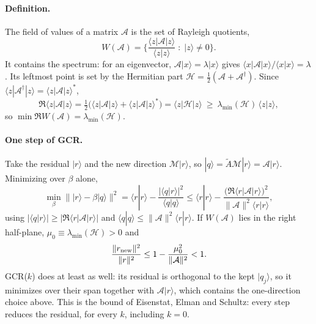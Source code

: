 \documentclass[11pt,a4paper]{article}
\numberwithin{equation}{section}
\newcommand{\dg}{^{\dagger}}
\begin{document}
\paragraph{Definition.} The field of values of a matrix $\mathcal A$ is the set of Rayleigh
quotients,
\begin{equation}
W(\mathcal A)=\Big\{\frac{\langle z|\mathcal A|z\rangle}{\langle z|z\rangle}\;:\;|z\rangle\neq0\Big\}.
\end{equation}
It contains the spectrum: for an eigenvector, $\mathcal A|x\rangle=\lambda|x\rangle$ gives
$\langle x|\mathcal A|x\rangle/\langle x|x\rangle=\lambda$. Its leftmost point is set by the Hermitian
part $\mathcal H=\frac12(\mathcal A+\mathcal A\dg)$. Since
$\langle z|\mathcal A\dg|z\rangle=\langle z|\mathcal A|z\rangle^*$,
\begin{equation}
\Re\langle z|\mathcal A|z\rangle=\tfrac12\big(\langle z|\mathcal A|z\rangle+\langle z|\mathcal A|z\rangle^*\big)
=\langle z|\mathcal H|z\rangle\ \ge\ \lambda_{\min}(\mathcal H)\,\langle z|z\rangle ,
\end{equation}
so $\min\Re W(\mathcal A)=\lambda_{\min}(\mathcal H)$.

\paragraph{One step of GCR.} Take the residual $|r\rangle$ and the new direction $\mathcal M|r\rangle$,
so $|q\rangle=\tilde A\mathcal M|r\rangle=\mathcal A|r\rangle$. Minimizing over $\beta$ alone,
\begin{equation}
\min_\beta\big\||r\rangle-\beta|q\rangle\big\|^2=\langle r|r\rangle-\frac{|\langle q|r\rangle|^2}{\langle q|q\rangle}
\le\langle r|r\rangle-\frac{\big(\Re\langle r|\mathcal A|r\rangle\big)^2}{\|\mathcal A\|^2\langle r|r\rangle},
\end{equation}
using $|\langle q|r\rangle|\ge|\Re\langle r|\mathcal A|r\rangle|$ and $\langle q|q\rangle\le\|\mathcal A\|^2\langle r|r\rangle$.
If $W(\mathcal A)$ lies in the right half-plane, $\mu_0\equiv\lambda_{\min}(\mathcal H)>0$ and
\begin{equation}
\frac{\|r_{\rm new}\|^2}{\|r\|^2}\le1-\frac{\mu_0^2}{\|\mathcal A\|^2}<1 .
\end{equation}
GCR($k$) does at least as well: its residual is orthogonal to the kept $|q_j\rangle$, so it
minimizes over their span together with $\mathcal A|r\rangle$, which contains the one-direction
choice above. This is the bound of Eisenstat, Elman and Schultz: every step reduces the residual,
for every $k$, including $k=0$.
\end{document}
